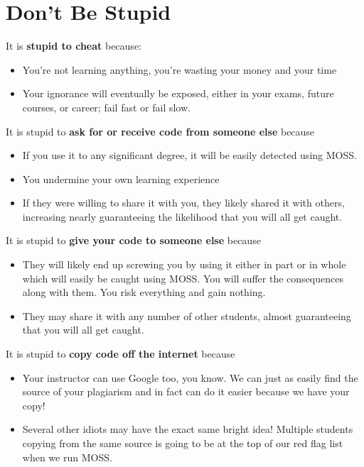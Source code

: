 \documentclass[12pt]{scrartcl}
\begin{document}
\section*{Don't Be Stupid}

It is \textbf{stupid to cheat} because:
\begin{itemize}
  \item You're not learning anything, you're wasting your money and your time 
  \item Your ignorance will eventually be exposed, either in your exams, future courses, or career; fail fast or fail slow.
\end{itemize}

It is stupid to \textbf{ask for or receive code from someone else} because
\begin{itemize}
  \item If you use it to any significant degree, it will be easily detected using MOSS.
  \item You undermine your own learning experience
  \item If they were willing to share it with you, they likely shared it with others, increasing nearly guaranteeing the likelihood that you will all get caught.
\end{itemize}

It is stupid to \textbf{give your code to someone else} because
\begin{itemize}
  \item They will likely end up screwing you by using it either in part or in whole which will easily be caught using MOSS.  You will suffer the consequences along with them.  You risk everything and gain nothing.
  \item They may share it with any number of other students, almost guaranteeing that you will all get caught.
\end{itemize}

It is stupid to \textbf{copy code off the internet} because
\begin{itemize}
  \item Your instructor can use Google too, you know.  We can just as easily find the source of your plagiarism and in fact can do it easier because we have your copy!
  \item Several other idiots may have the exact same bright idea!  Multiple students copying from the same source is going to be at the top of our red flag list when we run MOSS.
\end{itemize}
\end{document}
